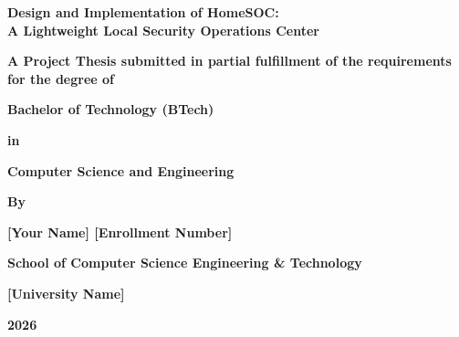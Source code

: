 \documentclass[12pt, a4paper, oneside]{report}
\begin{document}
\begin{titlepage}
    \centering
    \vspace*{2cm}
    
    {\fontsize{14pt}{16.8pt}\selectfont \textbf{Design and Implementation of HomeSOC:\\ A Lightweight Local Security Operations Center}\par}
    
    \vspace{3cm}
    
    {\fontsize{12pt}{14.4pt}\selectfont \textbf{A Project Thesis submitted in partial fulfillment of the requirements for the degree of}\par}
    
    \vspace{1cm}
    {\fontsize{12pt}{14.4pt}\selectfont \textbf{Bachelor of Technology (BTech)}\par}
    {\fontsize{12pt}{14.4pt}\selectfont \textbf{in}\par}
    {\fontsize{12pt}{14.4pt}\selectfont \textbf{Computer Science and Engineering}\par}
    
    \vspace{2cm}
    
    {\fontsize{12pt}{14.4pt}\selectfont \textbf{By}\par}
    \vspace{0.5cm}
    {\fontsize{12pt}{14.4pt}\selectfont \textbf{[Your Name] \hspace{1cm} [Enrollment Number]}\par}
    
    \vfill
    
    {\fontsize{12pt}{14.4pt}\selectfont \textbf{School of Computer Science Engineering \& Technology}\par}
    {\fontsize{12pt}{14.4pt}\selectfont \textbf{[University Name]}\par}
    {\fontsize{12pt}{14.4pt}\selectfont \textbf{2026}\par}
\end{titlepage}
\restoregeometry %

\setcounter{page}{1}



\clearpage
{}
\setcounter{page}{1}








\clearpage


\appendix

\end{document}
